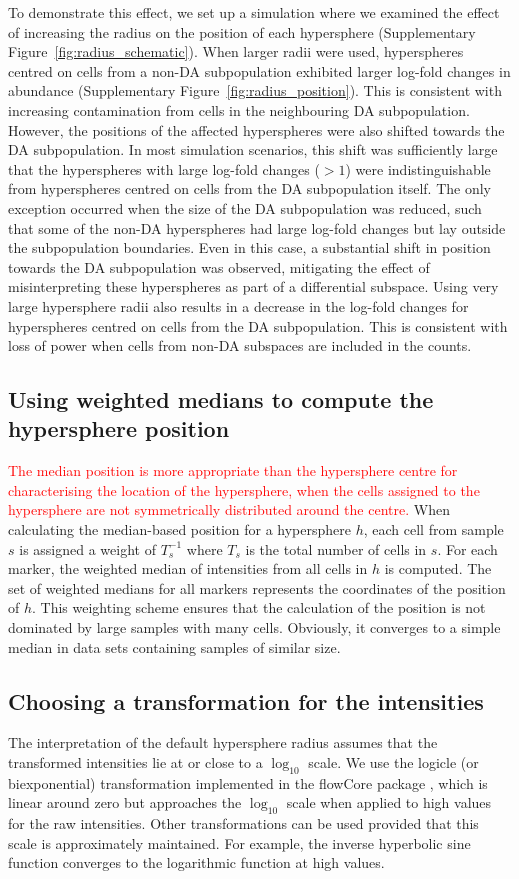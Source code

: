 \documentclass{article}
\newcommand\revised[1]{\textcolor{red}{#1}}
\begin{document}
To demonstrate this effect, we set up a simulation where we examined the effect of increasing the radius on the position of each hypersphere (Supplementary Figure~\ref{fig:radius_schematic}).
When larger radii were used, hyperspheres centred on cells from a non-DA subpopulation exhibited larger log-fold changes in abundance (Supplementary Figure~\ref{fig:radius_position}).
This is consistent with increasing contamination from cells in the neighbouring DA subpopulation.
However, the positions of the affected hyperspheres were also shifted towards the DA subpopulation.
In most simulation scenarios, this shift was sufficiently large that the hyperspheres with large log-fold changes ($>1$) were indistinguishable from hyperspheres centred on cells from the DA subpopulation itself.
The only exception occurred when the size of the DA subpopulation was reduced, such that some of the non-DA hyperspheres had large log-fold changes but lay outside the subpopulation boundaries.
Even in this case, a substantial shift in position towards the DA subpopulation was observed, mitigating the effect of misinterpreting these hyperspheres as part of a differential subspace.
Using very large hypersphere radii also results in a decrease in the log-fold changes for hyperspheres centred on cells from the DA subpopulation.
This is consistent with loss of power when cells from non-DA subspaces are included in the counts.

\subsection{Using weighted medians to compute the hypersphere position}
\revised{The median position is more appropriate than the hypersphere centre for characterising the location of the hypersphere, when the cells assigned to the hypersphere are not symmetrically distributed around the centre.}
When calculating the median-based position for a hypersphere $h$, each cell from sample $s$ is assigned a weight of $T_s^{-1}$ where $T_s$ is the total number of cells in $s$.
For each marker, the weighted median of intensities from all cells in $h$ is computed.
The set of weighted medians for all markers represents the coordinates of the position of $h$.
This weighting scheme ensures that the calculation of the position is not dominated by large samples with many cells.
Obviously, it converges to a simple median in data sets containing samples of similar size.

\subsection{Choosing a transformation for the intensities}
The interpretation of the default hypersphere radius assumes that the transformed intensities lie at or close to a $\log_{10}$ scale.
We use the logicle (or biexponential) transformation \cite{parks2006new} implemented in the flowCore package \cite{hahne2009flowcore}, which is linear around zero but approaches the $\log_{10}$ scale when applied to high values for the raw intensities.
Other transformations can be used provided that this scale is approximately maintained.
For example, the inverse hyperbolic sine function converges to the logarithmic function at high values.
\end{document}
